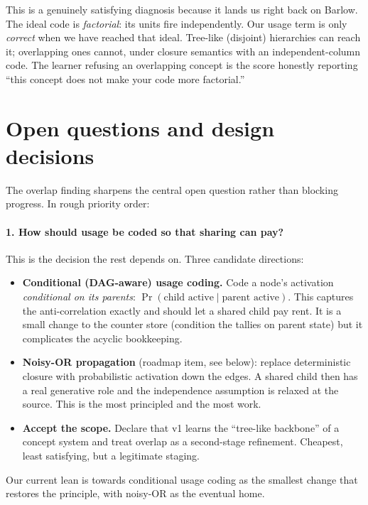 \documentclass[11pt]{article}
\begin{document}
This is a genuinely satisfying diagnosis because it lands us right back on
Barlow. The ideal code is \emph{factorial}: its units fire independently. Our
usage term is only \emph{correct} when we have reached that ideal. Tree-like
(disjoint) hierarchies can reach it; overlapping ones cannot, under closure
semantics with an independent-column code. The learner refusing an overlapping
concept is the score honestly reporting ``this concept does not make your code
more factorial.''

\section{Open questions and design decisions}

The overlap finding sharpens the central open question rather than blocking
progress. In rough priority order:

\paragraph{1. How should usage be coded so that sharing can pay?}
This is the decision the rest depends on. Three candidate directions:
\begin{itemize}
  \item \textbf{Conditional (DAG-aware) usage coding.} Code a node's activation
        \emph{conditional on its parents}: $\Pr(\text{child active}\mid
        \text{parent active})$. This captures the anti-correlation exactly and
        should let a shared child pay rent. It is a small change to the counter
        store (condition the tallies on parent state) but it complicates the
        acyclic bookkeeping.
  \item \textbf{Noisy-OR propagation} (roadmap item, see below): replace
        deterministic closure with probabilistic activation down the edges. A
        shared child then has a real generative role and the independence
        assumption is relaxed at the source. This is the most principled and the
        most work.
  \item \textbf{Accept the scope.} Declare that v1 learns the ``tree-like
        backbone'' of a concept system and treat overlap as a second-stage
        refinement. Cheapest, least satisfying, but a legitimate staging.
\end{itemize}
Our current lean is towards conditional usage coding as the smallest change that
restores the principle, with noisy-OR as the eventual home.
\end{document}
